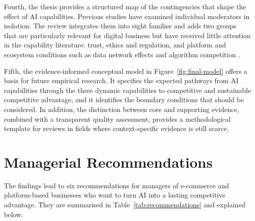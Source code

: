 Fourth, the thesis provides a structured map of the contingencies that shape the effect of AI capabilities. Previous studies have examined individual moderators in isolation. The review integrates them into eight families and adds two groups that are particularly relevant for digital business but have received little attention in the capability literature: trust, ethics and regulation, and platform and ecosystem conditions such as data network effects and algorithm competition \parencites[534]{gregory2021}[187]{chen2026}.

Fifth, the evidence-informed conceptual model in Figure~\ref{fig:final-model} offers a basis for future empirical research. It specifies the expected pathways from AI capabilities through the three dynamic capabilities to competitive and sustainable competitive advantage, and it identifies the boundary conditions that should be considered. In addition, the distinction between core and supporting evidence, combined with a transparent quality assessment, provides a methodological template for reviews in fields where context-specific evidence is still scarce.

\section{Managerial Recommendations}
\label{sec:recommendations}

The findings lead to six recommendations for managers of e-commerce and platform-based businesses who want to turn AI into a lasting competitive advantage. They are summarised in Table~\ref{tab:recommendations} and explained below.

